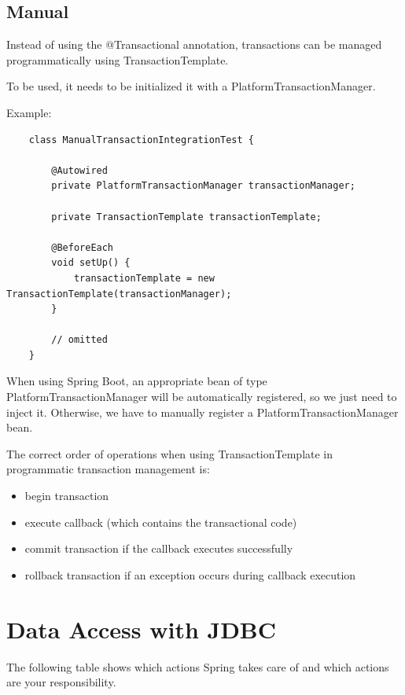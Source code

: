 \documentclass{scrartcl}
\begin{document}
\subsection{Manual}

Instead of using the @Transactional annotation, transactions can be managed programmatically using TransactionTemplate.

To be used, it needs to be initialized it with a PlatformTransactionManager.

Example:

\begin{lstlisting}
    class ManualTransactionIntegrationTest {

        @Autowired
        private PlatformTransactionManager transactionManager;

        private TransactionTemplate transactionTemplate;

        @BeforeEach
        void setUp() {
            transactionTemplate = new TransactionTemplate(transactionManager);
        }

        // omitted
    }
\end{lstlisting}

When using Spring Boot, an appropriate bean of type PlatformTransactionManager will be automatically registered, so we just need to inject it. Otherwise, we have to manually register a PlatformTransactionManager bean.

The correct order of operations when using TransactionTemplate in programmatic transaction management is:

\begin{itemize}
    \item begin transaction
    \item execute callback (which contains the transactional code)
    \item commit transaction if the callback executes successfully
    \item rollback transaction if an exception occurs during callback execution
\end{itemize}

\section{Data Access with JDBC}

The following table shows which actions Spring takes care of and which actions are your responsibility.
\end{document}
